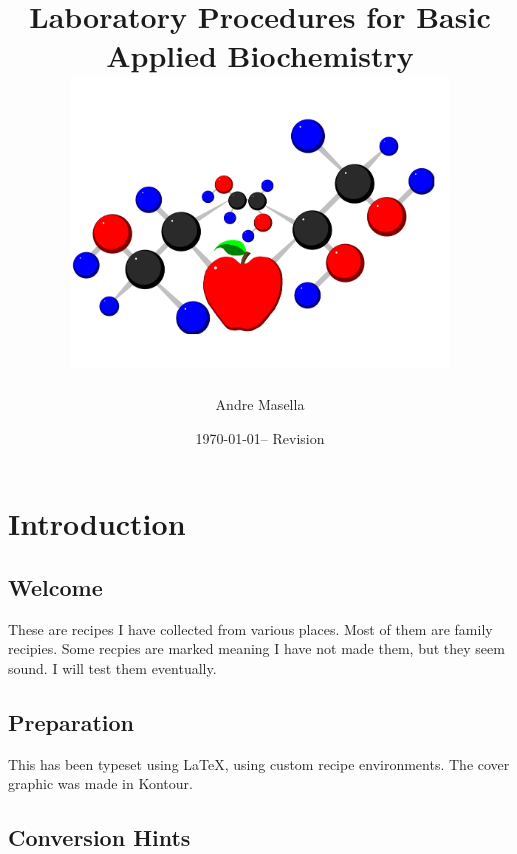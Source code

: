 \documentclass{book}
\begin{document}
\title{Laboratory Procedures for Basic Applied Biochemistry \\
\includegraphics[width=10cm]{CoverLogo} 
}
\author{ Andre Masella }
\date{\today -- $ $Revision$ $}
\maketitle

\tableofcontents

\chapter{ Introduction }

\section { Welcome }

These are recipes I have collected from various places. Most of them are
family recipies. Some recpies are marked \UNTESTED meaning I have not
made them, but they seem sound.  I will test them eventually.\par

\section { Preparation }

This has been typeset using \LaTeX{}, using custom recipe environments.
The cover graphic was made in Kontour.\par

\section { Conversion Hints }
\end{document}
